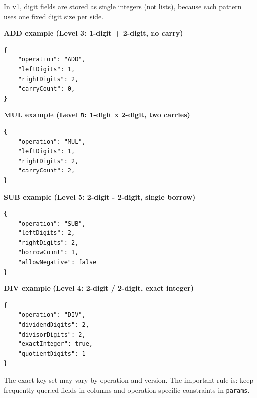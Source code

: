 \documentclass[11pt]{article}
\begin{document}
In v1, digit fields are stored as single integers (not lists),
because each pattern uses one fixed digit size per side.

\textbf{ADD example (Level 3: 1-digit + 2-digit, no carry)}

\begin{verbatim}
{
    "operation": "ADD",
    "leftDigits": 1,
    "rightDigits": 2,
    "carryCount": 0,
}
\end{verbatim}

\textbf{MUL example (Level 5: 1-digit x 2-digit, two carries)}

\begin{verbatim}
{
    "operation": "MUL",
    "leftDigits": 1,
    "rightDigits": 2,
    "carryCount": 2,
}
\end{verbatim}

\textbf{SUB example (Level 5: 2-digit - 2-digit, single borrow)}

\begin{verbatim}
{
    "operation": "SUB",
    "leftDigits": 2,
    "rightDigits": 2,
    "borrowCount": 1,
    "allowNegative": false
}
\end{verbatim}

\textbf{DIV example (Level 4: 2-digit / 2-digit, exact integer)}

\begin{verbatim}
{
    "operation": "DIV",
    "dividendDigits": 2,
    "divisorDigits": 2,
    "exactInteger": true,
    "quotientDigits": 1
}
\end{verbatim}

The exact key set may vary by operation and version. The important rule is:
keep frequently queried fields in columns and operation-specific constraints in \texttt{params}.
\end{document}
